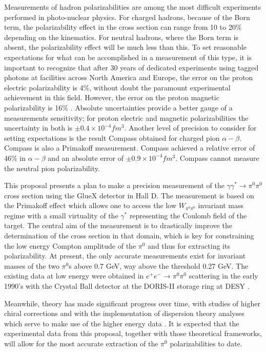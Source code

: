 Measurements of hadron polarizabilities are among the most difficult experiments performed in photo-nuclear physics. For charged hadrons, because of the Born term,  the polarizability effect in the cross section can range from 10 to 20\% depending on the kinematics.   For neutral hadrons, where the Born term is absent, the polarizability effect will be much less than this.    To set reasonable expectations for what can be accomplished in a measurement of this type, it is important to recognize that after 30 years of dedicated experiments using tagged photons at facilities across North America and Europe, the error on the proton electric polarizability is 4\%, without doubt the paramount experimental achievement in this field. However, the error on the proton magnetic polarizability is 16\% \cite{PDGTanabashi:2018oca}.  Absolute uncertainties provide a better gauge of a measurements sensitivity;  for proton electric and magnetic polarizabilities  the uncertainty in both is $\pm 0.4 \times 10^{-4} fm^3$.   Another level of precision to consider for setting expectations is the result Compass obtained for charged pion $\alpha - \beta$. Compass is also a Primakoff measurement. Compass achieved a relative error of 46\% in $\alpha - \beta$ and an absolute error of $\pm 0.9 \times 10^{-4} fm^3$.  Compass cannot measure the neutral pion polarizability. 



This proposal presents a plan to make a precision measurement of the
$\gamma \gamma^* \rightarrow \pi^0 \pi^0$ cross section using the
GlueX detector in Hall D.  The measurement is based on the Primakoff
effect which allows one to access the low $W_{\pi^0\pi^0}$ invariant
mass regime with a small virtuality of the $\gamma^*$ representing the
Coulomb field of the target. The central aim of the measurement is to
drastically improve the determination of the cross section in that
domain, which is key for constraining the low energy Compton amplitude
of the $\pi^0$ and thus for extracting its polarizability.  At
present, the only accurate measurements exist for invariant masses of
the two $\pi^0$s above 0.7 GeV, way above the threshold 0.27 GeV. The
existing data at low energy were obtained in $e^+ e^- \to \pi^0\pi^0 $
scattering in the early 1990's with the Crystal Ball detector at the
DORIS-II storage ring at DESY \cite{Marsiske:1990hx}.

Meanwhile, theory has made significant progress over time, with
studies of higher chiral corrections 
\cite{Bellucci:1994eb,Gasser:2005ud,Aleksejevs:2014eea} and with the
implementation of dispersion theory analyses which serve to make use
of the higher energy data
\cite{Oller:2008kf,Dai:2014zta,Dai:2014lza,Moussallam:2013una}. It is
expected that the experimental data from this proposal, together with
those theoretical frameworks, will allow for the most accurate
extraction of the $\pi^0$ polarizabilities to date.

